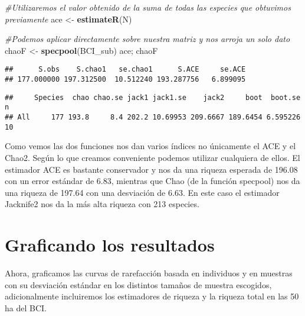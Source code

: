 \documentclass[]{book}
\newenvironment{Shaded}{\begin{snugshade}}{\end{snugshade}}
\newcommand{\KeywordTok}[1]{\textcolor[rgb]{0.13,0.29,0.53}{\textbf{{#1}}}}
\newcommand{\StringTok}[1]{\textcolor[rgb]{0.31,0.60,0.02}{{#1}}}
\newcommand{\CommentTok}[1]{\textcolor[rgb]{0.56,0.35,0.01}{\textit{{#1}}}}
\newcommand{\NormalTok}[1]{{#1}}
\begin{document}
\begin{Shaded}
\begin{Highlighting}[]
\CommentTok{#Utilizaremos el valor obtenido de la suma de todas las especies que obtuvimos previamente}
\NormalTok{ace <-}\StringTok{ }\KeywordTok{estimateR}\NormalTok{(N)}

\CommentTok{#Podemos aplicar directamente sobre nuestra matriz y nos arroja un solo dato}
\NormalTok{chaoF <-}\StringTok{ }\KeywordTok{specpool}\NormalTok{(BCI_sub) }
\NormalTok{ace; chaoF}
\end{Highlighting}
\end{Shaded}

\begin{verbatim}
##      S.obs    S.chao1   se.chao1      S.ACE     se.ACE 
## 177.000000 197.312500  10.512240 193.287756   6.899095
\end{verbatim}

\begin{verbatim}
##     Species  chao chao.se jack1 jack1.se    jack2     boot  boot.se  n
## All     177 193.8     8.4 202.2 10.69953 209.6667 189.6454 6.595226 10
\end{verbatim}

Como vemos las dos funciones nos dan varios índices no únicamente el ACE
y el Chao2. Según lo que creamos conveniente podemos utilizar cualquiera
de ellos. El estimador ACE es bastante conservador y nos da una riqueza
esperada de 196.08 con un error estándar de 6.83, mientras que Chao (de
la función specpool) nos da una riqueza de 197.64 con una desviación de
6.63. En este caso el estimador Jacknife2 nos da la más alta riqueza con
213 especies.

\section{Graficando los resultados}\label{graficando-los-resultados}

Ahora, graficamos las curvas de rarefacción basada en individuos y en
muestras con su desviación estándar en los distintos tamaños de muestra
escogidos, adicionalmente incluiremos los estimadores de riqueza y la
riqueza total en las 50 ha del BCI.
\end{document}
